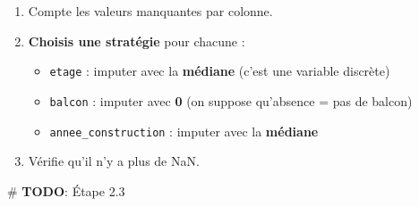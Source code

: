 \documentclass[
  french,
  11pt,
  a4paper,
]{scrbook}
\newenvironment{Shaded}{}{}
\newcommand{\AlertTok}[1]{\textcolor[rgb]{1.00,0.33,0.33}{\textbf{#1}}}
\newcommand{\CommentTok}[1]{\textcolor[rgb]{0.42,0.45,0.49}{#1}}
\providecommand{\tightlist}{%
  \setlength{\itemsep}{0pt}\setlength{\parskip}{0pt}}
\begin{document}
\begin{tcolorbox}[enhanced jigsaw, arc=.35mm, bottomrule=.15mm, bottomtitle=1mm, breakable, colback=white, colbacktitle=quarto-callout-note-color!10!white, colframe=quarto-callout-note-color-frame, coltitle=black, left=2mm, leftrule=.75mm, opacityback=0, opacitybacktitle=0.6, rightrule=.15mm, title={📝 À faire}, titlerule=0mm, toprule=.15mm, toptitle=1mm]

\begin{enumerate}
\def\labelenumi{\arabic{enumi}.}
\tightlist
\item
  Compte les valeurs manquantes par colonne.
\item
  \textbf{Choisis une stratégie} pour chacune :

  \begin{itemize}
  \tightlist
  \item
    \texttt{etage} : imputer avec la \textbf{médiane} (c'est une
    variable discrète)
  \item
    \texttt{balcon} : imputer avec \textbf{0} (on suppose qu'absence =
    pas de balcon)
  \item
    \texttt{annee\_construction} : imputer avec la \textbf{médiane}
  \end{itemize}
\item
  Vérifie qu'il n'y a plus de NaN.
\end{enumerate}

\end{tcolorbox}

\begin{Shaded}
\begin{Highlighting}[]
\CommentTok{\# }\AlertTok{TODO}\CommentTok{: Étape 2.3}
\end{Highlighting}
\end{Shaded}
\end{document}
